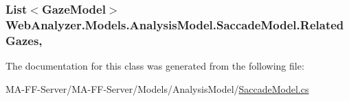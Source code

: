 \subsubsection[{Related\+Gazes}]{\setlength{\rightskip}{0pt plus 5cm}List$<${\bf Gaze\+Model}$>$ Web\+Analyzer.\+Models.\+Analysis\+Model.\+Saccade\+Model.\+Related\+Gazes\hspace{0.3cm}{\ttfamily [get]}, {\ttfamily [set]}}\label{class_web_analyzer_1_1_models_1_1_analysis_model_1_1_saccade_model_a32d8fa96fd180fbbfee83b47fd8e72f9}


The documentation for this class was generated from the following file\+:\begin{DoxyCompactItemize}
\item 
M\+A-\/\+F\+F-\/\+Server/\+M\+A-\/\+F\+F-\/\+Server/\+Models/\+Analysis\+Model/\hyperlink{_saccade_model_8cs}{Saccade\+Model.\+cs}\end{DoxyCompactItemize}
